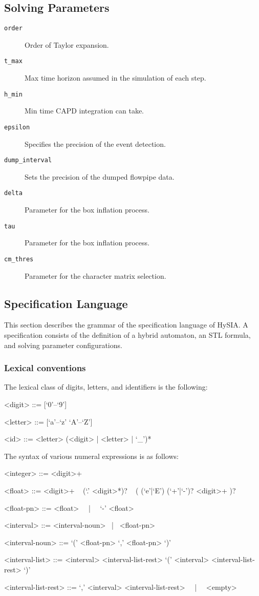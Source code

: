 \documentclass[12pt,a4paper]{article}
\begin{document}
\subsection{Solving Parameters}

\begin{description}
\item[\texttt{order}] Order of Taylor expansion.
\item[\texttt{t_max}] Max time horizon assumed in the simulation of each step.
\item[\texttt{h_min}] Min time CAPD integration can take.
\item[\texttt{epsilon}] Specifies the precision of the event detection.
\item[\texttt{dump_interval}] Sets the precision of the dumped flowpipe data.
\item[\texttt{delta}] Parameter for the box inflation process.
\item[\texttt{tau}] Parameter for the box inflation process.
\item[\texttt{cm_thres}] Parameter for the character matrix selection.
\end{description}


\subsection{Specification Language}

This section describes the grammar of the specification language of HySIA.
A specification consists of the definition of a hybrid automaton, an STL formula, and solving parameter configurations.

\subsubsection{Lexical conventions}

The lexical class of digits, letters, and identifiers is the following:
\begin{grammar}
<digit> ::= [`0'--`9']

<letter> ::= [`a'--`z' `A'--`Z']

<id> ::= <letter> (<digit> | <letter> | `_')*
\end{grammar}

The syntax of various numeral expressions is as follows:
\begin{grammar}
<integer> ::= <digit>+

<float> ::= 
<digit>+ ~ (`.' <digit>*)? ~ ( (`e'|`E') (`+'|`-')? <digit>+ )?

<float-pn> ::= <float> ~~|~~ `-' <float>

<interval> ::= <interval-noun> ~|~ <float-pn>

<interval-noun> ::= `(' <float-pn> `,' <float-pn> `)'

<interval-list> ::= <interval> <interval-list-rest>
\alt `(' <interval> <interval-list-rest> `)'

<interval-list-rest> ::= `,' <interval> <interval-list-rest> ~~|~~ <empty>
\end{grammar}
\end{document}
